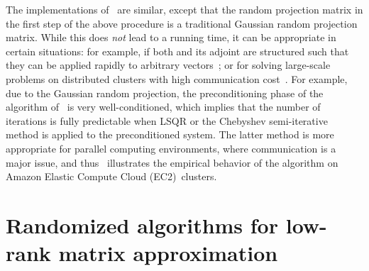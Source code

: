 \documentclass[twoside]{article}
\begin{document}
The implementations of~\cite{CRT11,MSM11_TR} are similar, except that the 
random projection matrix in the first step of the above procedure is a 
traditional Gaussian random projection matrix.
While this does \emph{not} lead to a  running time, it can be 
appropriate in certain situations: for example, if both  and its adjoint
 are structured such that they can be applied rapidly to arbitrary 
vectors~\cite{CRT11}; or for solving large-scale problems on distributed 
clusters with high communication cost~\cite{MSM11_TR}.
For example, due to the Gaussian random projection, the preconditioning 
phase of the algorithm of~\cite{MSM11_TR} is very well-conditioned, which 
implies that the number of iterations is fully predictable when LSQR or the 
Chebyshev semi-iterative method is applied to the preconditioned system.
The latter method is more appropriate for parallel computing environments, 
where communication is a major issue,
and thus~\cite{MSM11_TR} illustrates the empirical behavior of the algorithm 
on Amazon Elastic Compute Cloud (EC2)~clusters.


 \section{Randomized algorithms for low-rank matrix approximation}
\label{sxn:low-rank}
\end{document}
